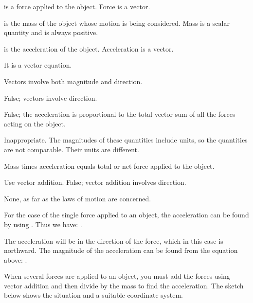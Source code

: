 {\begin{two-digit-list}
\item [2.]  is a force applied to the object.
Force is a vector.

\item [3.]  is the mass of the object whose motion is being considered.
Mass is a scalar quantity and is always positive.

\item [4.]  is the acceleration of the object.
Acceleration is a vector.

\item [5.] It is a vector equation.

\item [6.] Vectors involve both magnitude and direction.

\item [7.] False; vectors involve direction.

\item [8.] False; the acceleration is proportional to the total vector sum of
all the forces acting on the object.

\item [9.] Inappropriate.
The magnitudes of these quantities include units, so the quantities are not
comparable.
Their units are different.

\item [10.] Mass times acceleration equals total or net force applied to the
object.

\item [11.] Use vector addition.
False; vector addition involves direction.

\item [12.] None, as far as the laws of motion are concerned.
\end{two-digit-list}


{For the case of the single force applied to an object, the acceleration can
 be found by using .
 Thus we have: .

 The acceleration will be in the direction of the force, which in this case is
 northward.
 The magnitude of the acceleration can be found from the equation above:
 .
}

{When several forces are applied to an object, you must add the forces using
 vector addition and then divide by the mass to find the acceleration.
 The sketch below shows the situation and a suitable coordinate system.
 
}}

